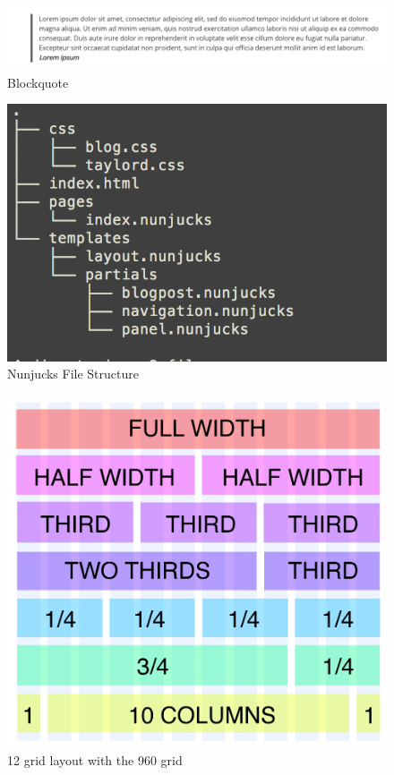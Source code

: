 \begin{figure}[h]
\caption{Blockquote}
  \label{fig:quote}
\includegraphics[scale=0.4]{../public/images/blockquote}
\centering
\end{figure}


\begin{figure}[ht]
\caption{Nunjucks File Structure}
  \label{fig:structure}
\includegraphics[scale=0.5]{../public/images/fileStructure}
\centering
\end{figure}

\begin{figure}[ht]
\caption{12 grid layout with the 960 grid}
  \label{fig:grid}
\includegraphics[scale=0.2]{../public/images/960-12-col-grid}
\centering
\end{figure}

